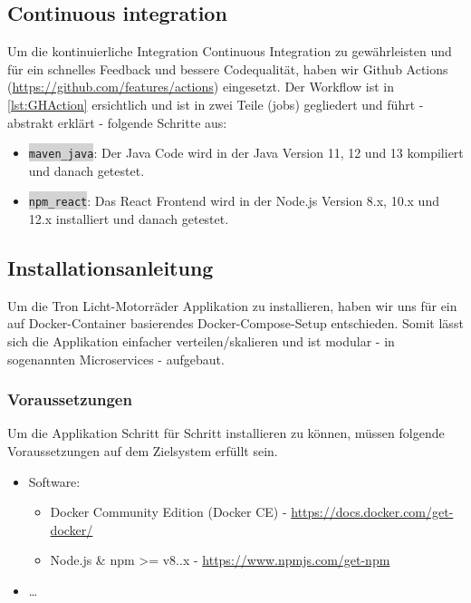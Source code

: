 \documentclass[11pt,ngerman]{article}
\newcommand{\inlinecode}[2]{\colorbox{lightgray}{\lstinline[language=#1]$#2$}}
\begin{document}
    \subsection{Continuous integration}
    Um  die kontinuierliche Integration \Gls{Continuous Integration} zu gewährleisten und für ein schnelles Feedback und bessere Codequalität, haben wir Github Actions (\url{https://github.com/features/actions}) eingesetzt. Der Workflow ist in \autoref{lst:GHAction} ersichtlich  und ist in zwei Teile (jobs) gegliedert und führt - abstrakt erklärt - folgende Schritte aus:

    \begin{itemize}
        \item \inlinecode{bash}{maven_java}: Der Java Code wird in der Java Version 11, 12 und 13 kompiliert und danach getestet.
        \item \inlinecode{bash}{npm_react}: Das React Frontend wird in der Node.js Version 8.x, 10.x und 12.x installiert und danach getestet.
    \end{itemize}

    
    \vspace{.5cm}

    \subsection{Installationsanleitung}
    Um  die Tron Licht-Motorräder Applikation zu installieren, haben  wir uns für ein auf \Gls{Docker}-Container basierendes \Gls{Docker-Compose}-Setup entschieden. Somit lässt sich die Applikation einfacher verteilen/skalieren und ist modular - in sogenannten \Glspl{Microservice} - aufgebaut.

    \subsubsection{Voraussetzungen}
    Um die Applikation Schritt für Schritt installieren zu können, müssen folgende Voraussetzungen auf dem Zielsystem erfüllt sein.
    \begin{itemize}
        \item Software:
            \begin{itemize}
                \item Docker Community Edition (Docker CE) - \url{https://docs.docker.com/get-docker/}
                \item Node.js \& npm >= v8..x - \url{https://www.npmjs.com/get-npm}
            \end{itemize}
        \item …
    \end{itemize}
\end{document}

